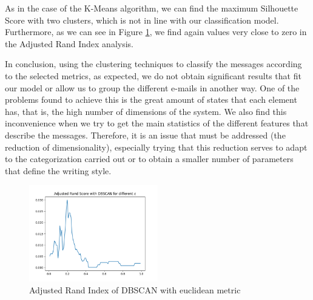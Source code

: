 As in the case of the K-Means algorithm, we can find the maximum Silhouette Score with two clusters, which is not in line with our classification model. Furthermore, as we can see in Figure \ref{fig:dbscanari}, we find again values very close to zero in the Adjusted Rand Index analysis.

In conclusion, using the clustering techniques to classify the messages according to the selected metrics, as expected, we do not obtain significant results that fit our model or allow us to group the different e-mails in another way. One of the problems found to achieve this is the great amount of states that each element has, that is, the high number of dimensions of the system. We also find this inconvenience when we try to get the main statistics of the different features that describe the messages. Therefore, it is an issue that must be addressed (the reduction of dimensionality), especially trying that this reduction serves to adapt to the categorization carried out or to obtain a smaller number of parameters that define the writing style.

\begin{figure}[h]
	\centering%
	\centerline{\includegraphics[width=0.5\textwidth]{Imagenes/Bitmap/Clustering/dbscanari.png}}%
	\caption{Adjusted Rand Index of DBSCAN with euclidean metric}%
	\label{fig:dbscanari}
\end{figure}